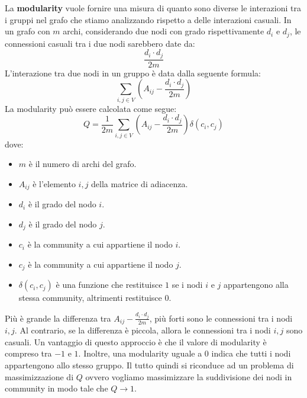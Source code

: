La \textbf{modularity} vuole fornire una misura di quanto sono diverse le
interazioni tra i gruppi nel grafo che stiamo analizzando rispetto a delle
interazioni casuali. In un grafo con $m$ archi, considerando due nodi con grado
rispettivamente $d_i$ e $d_j$, le connessioni casuali tra i due nodi sarebbero
date da:
\begin{equation}
    \frac{d_i \cdot d_j}{2m}
\end{equation}
L'interazione tra due nodi in un gruppo è data dalla seguente formula:
\begin{equation}
    \sum_{i, j\in V}\left(A_{ij} - \frac{d_i \cdot d_j}{2m}\right)
\end{equation}
La modularity può essere calcolata come segue:
\begin{equation}
    Q = \frac{1}{2m} \sum_{i, j\in V} \left( A_{ij} - \frac{d_i \cdot d_j}{2m} \right) \delta(c_i, c_j)
\end{equation}
dove:
\begin{itemize}
    \item $m$ è il numero di archi del grafo.
    \item $A_{ij}$ è l'elemento $i, j$ della matrice di adiacenza.
    \item $d_i$ è il grado del nodo $i$.
    \item $d_j$ è il grado del nodo $j$.
    \item $c_i$ è la community a cui appartiene il nodo $i$.
    \item $c_j$ è la community a cui appartiene il nodo $j$.
    \item $\delta(c_i, c_j)$ è una funzione che restituisce $1$ se i nodi $i$ e
          $j$ appartengono alla stessa community, altrimenti restituisce $0$.
\end{itemize}

Più è grande la differenza tra $A_{ij} - \frac{d_i \cdot d_j}{2m}$, più forti
sono le connessioni tra i nodi $i,j$. Al contrario, se la differenza è piccola,
allora le connessioni tra i nodi $i,j$ sono casuali.
Un vantaggio di questo approccio è che il valore di modularity è compreso tra
$-1$ e $1$. Inoltre, una modularity uguale a $0$ indica che tutti i nodi
appartengono allo stesso gruppo. Il tutto quindi si riconduce ad un problema di
massimizzazione di $Q$ ovvero vogliamo massimizzare la suddivisione dei nodi in
community in modo tale che $Q\to 1$.

